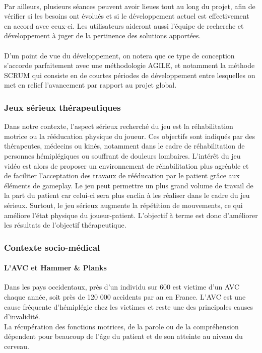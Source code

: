 \paragraph{}Par ailleurs, plusieurs séances peuvent avoir lieues tout au long du projet, afin de vérifier si les besoins ont évolués et si le développement actuel est effectivement en accord avec ceux-ci. Les utilisateurs aideront aussi l'équipe de recherche et développement à juger de la pertinence des solutions apportées.
\paragraph{}
D'un point de vue du développement, on notera que ce type de conception s'accorde parfaitement avec une méthodologie AGILE, et notamment la méthode SCRUM qui consiste en de courtes périodes de développement entre lesquelles on met en relief l'avancement par rapport au projet global.

	\subsubsection{Jeux sérieux thérapeutiques}
Dans notre contexte, l’aspect sérieux recherché du jeu est la réhabilitation motrice ou la rééducation physique du joueur. Ces objectifs sont indiqués par des thérapeutes, médecins ou kinés, notamment dans le cadre de réhabilitation de personnes hémiplégiques ou souffrant de douleurs lombaires. L’intérêt du jeu vidéo est alors de proposer un environnement de réhabilitation plus agréable et de faciliter l’acceptation des travaux de rééducation par le patient grâce aux éléments de gameplay. Le jeu peut permettre un plus grand volume de travail de la part du patient car celui-ci sera plus enclin à les réaliser dans le cadre du jeu sérieux. Surtout, le jeu sérieux augmente la répétition de mouvements, ce qui améliore l'état physique du joueur-patient. L’objectif à terme est donc d’améliorer les résultats de l’objectif thérapeutique.

	\subsubsection{Contexte socio-médical}
		\paragraph{L'AVC et Hammer \& Planks\\}
Dans les pays occidentaux, près d'un individu sur 600 est victime d'un AVC chaque année, soit près de 120 000 accidents par an en France. L'AVC est une cause fréquente d'hémiplégie chez les victimes et reste une des principales causes d'invalidité. \\
La récupération des fonctions motrices, de la parole ou de la compréhension dépendent pour beaucoup de l'âge du patient et de son atteinte au niveau du cerveau.
